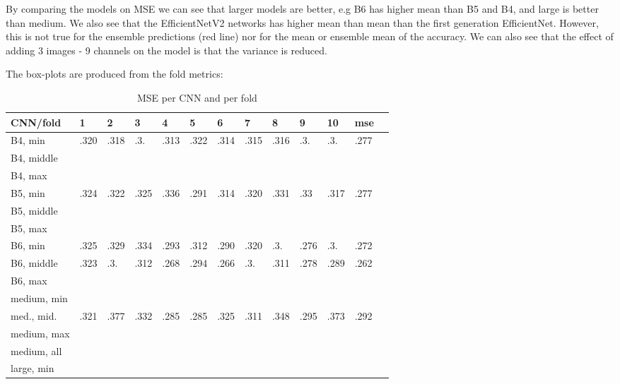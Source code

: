 \documentclass[10pt,letterpaper]{article}
\begin{document}
By comparing the models on MSE we can see that larger models are better, e.g B6 has 
higher mean than B5 and B4, and large is better than medium. 
We also see that the EfficientNetV2 networks has higher mean than mean than the
first generation EfficientNet. However, this is not true for the ensemble
predictions (red line) nor for the mean or ensemble mean of the accuracy.
We can also see that the effect of adding 3 images - 9 channels on the
model is that the variance is reduced.

The box-plots are produced from the fold metrics:
\begin{table}[!ht]
    \caption{MSE per CNN and per fold}
    \centering
    \begin{tabular}{|l|l|l|l|l|l|l|l|l|l|l|l|l|}
    \hline
        CNN/fold & 1 & 2 & 3 & 4 & 5 & 6 & 7 & 8 & 9 & 10 & mse \\ \hline
        B4, min & .320 & .318 & .3. & .313 & .322 & .314 & .315 & .316 & .3. & .3. & .277 \\ \hline
        B4, middle & ~ & ~ & ~ & ~ & ~ & ~ & ~ & ~ & ~ & ~ & ~ \\ \hline
        B4, max & ~ & ~ & ~ & ~ & ~ & ~ & ~ & ~ & ~ & ~ & ~ \\ \hline
        B5, min & .324 & .322 & .325 & .336 & .291 & .314 & .320 & .331 & .33 & .317 & .277 \\ \hline
        B5, middle & ~ & ~ & ~ & ~ & ~ & ~ & ~ & ~ & ~ & ~ & ~ \\ \hline
        B5, max & ~ & ~ & ~ & ~ & ~ & ~ & ~ & ~ & ~ & ~ & ~ \\ \hline
        B6, min & .325 & .329 & .334 & .293 & .312 & .290 & .320 & .3. & .276 & .3. & .272 \\ \hline
        B6, middle & .323 & .3. & .312 & .268 & .294 & .266 & .3. & .311 & .278 & .289 & .262 \\ \hline
        B6, max & ~ & ~ & ~ & ~ & ~ & ~ & ~ & ~ & ~ & ~ & ~ \\ \hline
        medium, min & ~ & ~ & ~ & ~ & ~ & ~ & ~ & ~ & ~ & ~ & ~ \\ \hline
        med., mid. & .321 & .377 & .332 & .285 & .285 & .325 & .311 & .348 & .295 & .373 & .292 \\ \hline
        medium, max & ~ & ~ & ~ & ~ & ~ & ~ & ~ & ~ & ~ & ~ & ~ \\ \hline
        medium, all & ~ & ~ & ~ & ~ & ~ & ~ & ~ & ~ & ~ & ~ & ~ \\ \hline
        large, min & ~ & ~ & ~ & ~ & ~ & ~ & ~ & ~ & ~ & ~ & ~ \\ \hline

\end{tabular}
\end{table}
\end{document}
